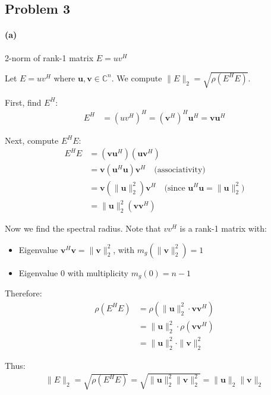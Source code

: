 \subsection{Problem 3}

\paragraph*{(a)} 2-norm of rank-1 matrix $E = uv^H$

Let $E = uv^H$ where $\mathbf{u}, \mathbf{v} \in \mathbb{C}^n$. We compute $\|E\|_2 = \sqrt{\rho(E^H E)}$.

First, find $E^H$:
\begin{align*}
    E^H & = (uv^H)^H = (\mathbf{v}^H)^H \mathbf{u}^H = \mathbf{v} \mathbf{u}^H
\end{align*}

Next, compute $E^H E$:
\begin{align*}
    E^H E & = (\mathbf{v} \mathbf{u}^H)(\mathbf{u} \mathbf{v}^H)                                                                     \\
          & = \mathbf{v} (\mathbf{u}^H \mathbf{u}) \mathbf{v}^H \quad \text{(associativity)}                                         \\
          & = \mathbf{v} (\|\mathbf{u}\|_2^2) \mathbf{v}^H \quad \text{(since } \mathbf{u}^H \mathbf{u} = \|\mathbf{u}\|_2^2\text{)} \\
          & = \|\mathbf{u}\|_2^2 (\mathbf{v} \mathbf{v}^H)
\end{align*}

Now we find the spectral radius. Note that $vv^H$ is a rank-1 matrix with:
\begin{itemize}
    \item Eigenvalue $\mathbf{v}^H \mathbf{v} = \|\mathbf{v}\|_2^2$, with $m_g(\|\mathbf{v}\|_2^2) = 1$
    \item Eigenvalue $0$ with multiplicity $m_g(0) = n-1$
\end{itemize}

Therefore:
\begin{align*}
    \rho(E^H E) & = \rho(\|\mathbf{u}\|_2^2 \cdot \mathbf{v} \mathbf{v}^H) \\
                & = \|\mathbf{u}\|_2^2 \cdot \rho(\mathbf{v} \mathbf{v}^H) \\
                & = \|\mathbf{u}\|_2^2 \cdot \|\mathbf{v}\|_2^2
\end{align*}

Thus:
\begin{align*}
    \|E\|_2 = \sqrt{\rho(E^H E)} = \sqrt{\|\mathbf{u}\|_2^2 \|\mathbf{v}\|_2^2} = \|\mathbf{u}\|_2 \|\mathbf{v}\|_2
\end{align*}

